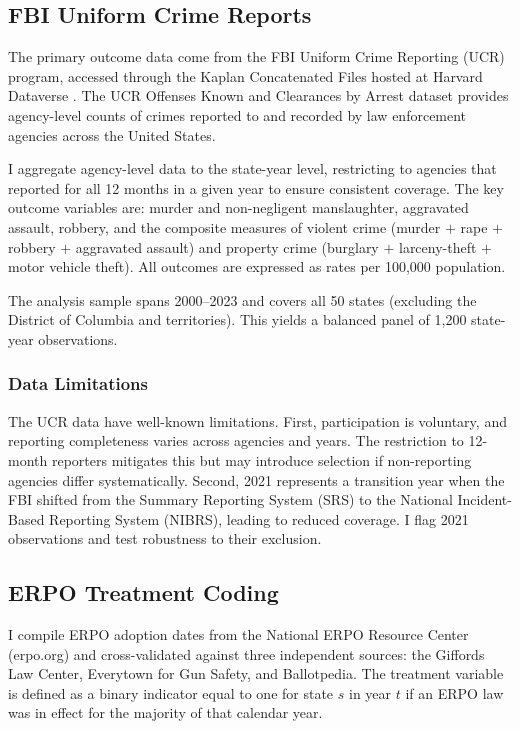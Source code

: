 \documentclass[12pt]{article}
\begin{document}
\subsection{FBI Uniform Crime Reports}

The primary outcome data come from the FBI Uniform Crime Reporting (UCR) program, accessed through the Kaplan Concatenated Files hosted at Harvard Dataverse \citep{kaplan2021ucr}. The UCR Offenses Known and Clearances by Arrest dataset provides agency-level counts of crimes reported to and recorded by law enforcement agencies across the United States.

I aggregate agency-level data to the state-year level, restricting to agencies that reported for all 12 months in a given year to ensure consistent coverage. The key outcome variables are: murder and non-negligent manslaughter, aggravated assault, robbery, and the composite measures of violent crime (murder $+$ rape $+$ robbery $+$ aggravated assault) and property crime (burglary $+$ larceny-theft $+$ motor vehicle theft). All outcomes are expressed as rates per 100,000 population.

The analysis sample spans 2000--2023 and covers all 50 states (excluding the District of Columbia and territories). This yields a balanced panel of 1,200 state-year observations.

\subsubsection{Data Limitations}

The UCR data have well-known limitations. First, participation is voluntary, and reporting completeness varies across agencies and years. The restriction to 12-month reporters mitigates this but may introduce selection if non-reporting agencies differ systematically. Second, 2021 represents a transition year when the FBI shifted from the Summary Reporting System (SRS) to the National Incident-Based Reporting System (NIBRS), leading to reduced coverage. I flag 2021 observations and test robustness to their exclusion.

\subsection{ERPO Treatment Coding}

I compile ERPO adoption dates from the National ERPO Resource Center (erpo.org) and cross-validated against three independent sources: the Giffords Law Center, Everytown for Gun Safety, and Ballotpedia. The treatment variable is defined as a binary indicator equal to one for state $s$ in year $t$ if an ERPO law was in effect for the majority of that calendar year.
\end{document}
